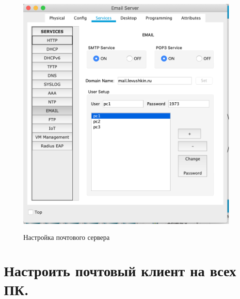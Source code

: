 \documentclass[a4paper,12pt]{article}
\begin{document}
	\begin{figure}[h!]
		\begin{center}
			{\includegraphics[scale = 0.7]{9.png}}
			\label{ris:9}
		\end{center}
		\caption{Настройка почтового сервера}
	\end{figure}

	\newpage
	
	\section{Настроить почтовый клиент на всех ПК.}
	
\end{document}
